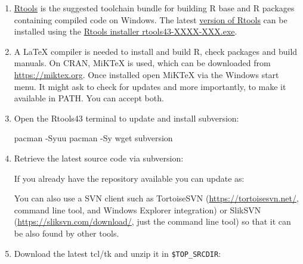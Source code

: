 \documentclass[
]{book}
\newenvironment{Shaded}{\begin{snugshade}}{\end{snugshade}}
\newcommand{\AttributeTok}[1]{\textcolor[rgb]{0.13,0.29,0.53}{#1}}
\newcommand{\BuiltInTok}[1]{#1}
\newcommand{\ExtensionTok}[1]{#1}
\newcommand{\FunctionTok}[1]{\textcolor[rgb]{0.13,0.29,0.53}{\textbf{#1}}}
\newcommand{\NormalTok}[1]{#1}
\newcommand{\OperatorTok}[1]{\textcolor[rgb]{0.81,0.36,0.00}{\textbf{#1}}}
\newcommand{\StringTok}[1]{\textcolor[rgb]{0.31,0.60,0.02}{#1}}
\newcommand{\VariableTok}[1]{\textcolor[rgb]{0.00,0.00,0.00}{#1}}
\begin{document}
\begin{enumerate}
\def\labelenumi{\arabic{enumi}.}
\item
  \href{https://cran.r-project.org/bin/windows/Rtools/}{Rtools} is the suggested toolchain bundle for building R base and R packages containing compiled code on Windows.
  The latest \href{https://cran.r-project.org/bin/windows/Rtools/rtools43/rtools.html}{version of Rtools} can be installed using the \href{https://cran.r-project.org/bin/windows/Rtools/rtools43/files/}{Rtools installer rtools43-XXXX-XXX.exe}.
\item
  A LaTeX compiler is needed to install and build R, check packages and build manuals.
  On CRAN, MiKTeX is used, which can be downloaded from \url{https://miktex.org}.
  Once installed open MiKTeX via the Windows start menu.
  It might ask to check for updates and more importantly, to make it available in PATH. You can accept both.
\item
  Open the Rtools43 terminal to update and install subversion:

\begin{Shaded}
\begin{Highlighting}[]
\ExtensionTok{pacman} \AttributeTok{{-}Syuu}
\ExtensionTok{pacman} \AttributeTok{{-}Sy}\NormalTok{ wget subversion}
\end{Highlighting}
\end{Shaded}
\item
  Retrieve the latest source code via subversion:

\begin{Shaded}
\end{Shaded}

  If you already have the repository available you can update as:

\begin{Shaded}
\end{Shaded}

  You can also use a SVN client such as TortoiseSVN (\url{https://tortoisesvn.net/}, command line tool, and Windows Explorer integration) or SlikSVN (\url{https://sliksvn.com/download/}, just the command line tool) so that it can be also found by other tools.
\item
  Download the latest tcl/tk and unzip it in \texttt{\$TOP\_SRCDIR}:


\end{enumerate}
\end{document}
